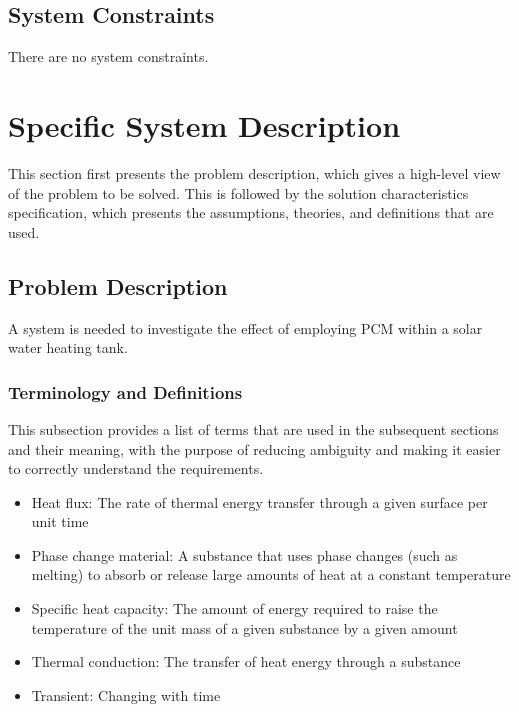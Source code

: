 \documentclass[12pt]{article}
\begin{document}
\subsection{System Constraints}
\label{Sec:SysConstraints}
There are no system constraints.
\section{Specific System Description}
\label{Sec:SpecSystDesc}
This section first presents the problem description, which gives a high-level view of the problem to be solved. This is followed by the solution characteristics specification, which presents the assumptions, theories, and definitions that are used.
\subsection{Problem Description}
\label{Sec:ProbDesc}
A system is needed to investigate the effect of employing PCM within a solar water heating tank.
\subsubsection{Terminology and Definitions}
\label{Sec:TermDefs}
This subsection provides a list of terms that are used in the subsequent sections and their meaning, with the purpose of reducing ambiguity and making it easier to correctly understand the requirements.
\begin{itemize}
\item{Heat flux: The rate of thermal energy transfer through a given surface per unit time}
\item{Phase change material: A substance that uses phase changes (such as melting) to absorb or release large amounts of heat at a constant temperature}
\item{Specific heat capacity: The amount of energy required to raise the temperature of the unit mass of a given substance by a given amount}
\item{Thermal conduction: The transfer of heat energy through a substance}
\item{Transient: Changing with time}
\end{itemize}
\end{document}
